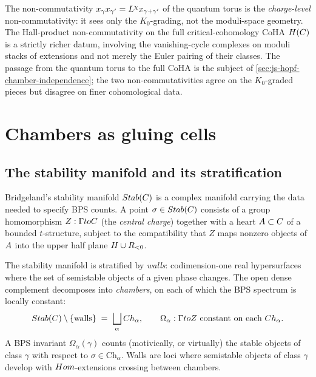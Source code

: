 \begin{remark}
  \label{rem:hall-product-distinct}
  The non-commutativity $x_\gamma x_{\gamma'} = L^\chi x_{\gamma+\gamma'}$ of the quantum
  torus is the \emph{charge-level} non-commutativity: it sees only the
  $K_0$-grading, not the moduli-space geometry. The Hall-product
  non-commutativity on the full critical-cohomology CoHA $H(C)$ is a
  strictly richer datum, involving the vanishing-cycle complexes on
  moduli stacks of extensions and not merely the Euler pairing of their
  classes. The passage from the quantum torus to the full CoHA is the
  subject of \cref{sec:js-hopf-chamber-independence}; the two
  non-commutativities agree on the $K_0$-graded pieces but disagree on
  finer cohomological data.
\end{remark}

\section{Chambers as gluing cells}
\label{sec:chambers-gluing-cells}

\subsection{The stability manifold and its stratification}

Bridgeland's stability manifold $Stab(C)$ is a complex manifold carrying
the data needed to specify BPS counts. A point $\sigma \in Stab(C)$
consists of a group homomorphism $Z : \Gamma to C$ (the
\emph{central charge}) together with a heart $A \subset C$ of a bounded
$t$-structure, subject to the compatibility that $Z$ maps nonzero objects of
$A$ into the upper half plane $H \cup R_{<0}$.

The stability manifold is stratified by \emph{walls}: codimension-one real
hypersurfaces where the set of semistable objects of a given phase changes.
The open dense complement decomposes into \emph{chambers}, on each of which
the BPS spectrum is locally constant:
\[
  Stab(C) \setminus \{\text{walls}\} \;=\; \bigsqcup_\alpha Ch_\alpha,
  \qquad \Omega_\alpha : \Gamma to Z\text{ constant on each } Ch_\alpha.
\]
A BPS invariant $\Omega_\alpha(\gamma)$ counts (motivically, or virtually)
the stable objects of class $\gamma$ with respect to $\sigma \in \mathrm{Ch}_\alpha$.
Walls are loci where semistable objects of class $\gamma$ develop with
$Hom$-extensions crossing between chambers.

